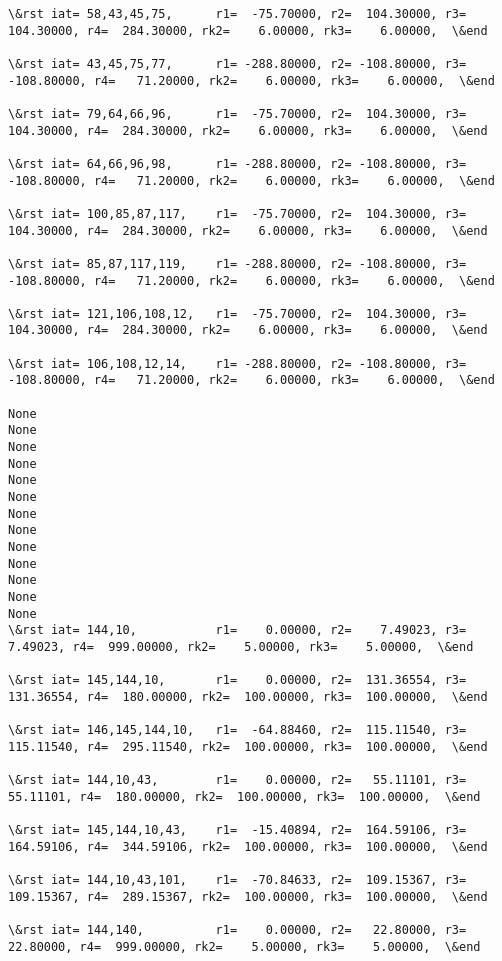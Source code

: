\documentclass[11pt]{article}
\begin{document}
\begin{Verbatim}[commandchars=\\\{\}]
\&rst iat= 58,43,45,75,      r1=  -75.70000, r2=  104.30000, r3=  104.30000, r4=  284.30000, rk2=    6.00000, rk3=    6.00000,  \&end

\&rst iat= 43,45,75,77,      r1= -288.80000, r2= -108.80000, r3= -108.80000, r4=   71.20000, rk2=    6.00000, rk3=    6.00000,  \&end

\&rst iat= 79,64,66,96,      r1=  -75.70000, r2=  104.30000, r3=  104.30000, r4=  284.30000, rk2=    6.00000, rk3=    6.00000,  \&end

\&rst iat= 64,66,96,98,      r1= -288.80000, r2= -108.80000, r3= -108.80000, r4=   71.20000, rk2=    6.00000, rk3=    6.00000,  \&end

\&rst iat= 100,85,87,117,    r1=  -75.70000, r2=  104.30000, r3=  104.30000, r4=  284.30000, rk2=    6.00000, rk3=    6.00000,  \&end

\&rst iat= 85,87,117,119,    r1= -288.80000, r2= -108.80000, r3= -108.80000, r4=   71.20000, rk2=    6.00000, rk3=    6.00000,  \&end

\&rst iat= 121,106,108,12,   r1=  -75.70000, r2=  104.30000, r3=  104.30000, r4=  284.30000, rk2=    6.00000, rk3=    6.00000,  \&end

\&rst iat= 106,108,12,14,    r1= -288.80000, r2= -108.80000, r3= -108.80000, r4=   71.20000, rk2=    6.00000, rk3=    6.00000,  \&end

None
None
None
None
None
None
None
None
None
None
None
None
None
\&rst iat= 144,10,           r1=    0.00000, r2=    7.49023, r3=    7.49023, r4=  999.00000, rk2=    5.00000, rk3=    5.00000,  \&end

\&rst iat= 145,144,10,       r1=    0.00000, r2=  131.36554, r3=  131.36554, r4=  180.00000, rk2=  100.00000, rk3=  100.00000,  \&end

\&rst iat= 146,145,144,10,   r1=  -64.88460, r2=  115.11540, r3=  115.11540, r4=  295.11540, rk2=  100.00000, rk3=  100.00000,  \&end

\&rst iat= 144,10,43,        r1=    0.00000, r2=   55.11101, r3=   55.11101, r4=  180.00000, rk2=  100.00000, rk3=  100.00000,  \&end

\&rst iat= 145,144,10,43,    r1=  -15.40894, r2=  164.59106, r3=  164.59106, r4=  344.59106, rk2=  100.00000, rk3=  100.00000,  \&end

\&rst iat= 144,10,43,101,    r1=  -70.84633, r2=  109.15367, r3=  109.15367, r4=  289.15367, rk2=  100.00000, rk3=  100.00000,  \&end

\&rst iat= 144,140,          r1=    0.00000, r2=   22.80000, r3=   22.80000, r4=  999.00000, rk2=    5.00000, rk3=    5.00000,  \&end


\end{Verbatim}
\end{document}
